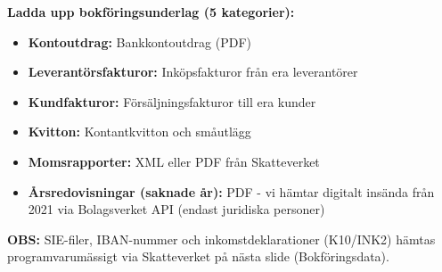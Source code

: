 \documentclass[10pt]{beamer}
\begin{document}
\begin{frame}[label=bokforingsunderlag]
  \vspace{0.4cm}
  \textbf{Ladda upp bokföringsunderlag (5 kategorier):}\\
  \vspace{0.2cm}
  \footnotesize
  \begin{itemize}
    \item \textbf{Kontoutdrag:} Bankkontoutdrag (PDF)
    \item \textbf{Leverantörsfakturor:} Inköpsfakturor från era leverantörer
    \item \textbf{Kundfakturor:} Försäljningsfakturor till era kunder
    \item \textbf{Kvitton:} Kontantkvitton och småutlägg
    \item \textbf{Momsrapporter:} XML eller PDF från Skatteverket
    \item \textbf{Årsredovisningar (saknade år):} PDF - vi hämtar digitalt insända från 2021 via Bolagsverket API (endast juridiska personer)
  \end{itemize}
  
  \vspace{0.3cm}
  \textbf{OBS:} SIE-filer, IBAN-nummer och inkomstdeklarationer (K10/INK2) hämtas programvarumässigt via Skatteverket på nästa slide (Bokföringsdata).
  
  \vspace{0.3cm}
  
  \vspace{0.3cm}
  \begin{flushright}
    \hyperlink{popup-layering-kostnad}{}
  \end{flushright}
\end{frame}
\end{document}
